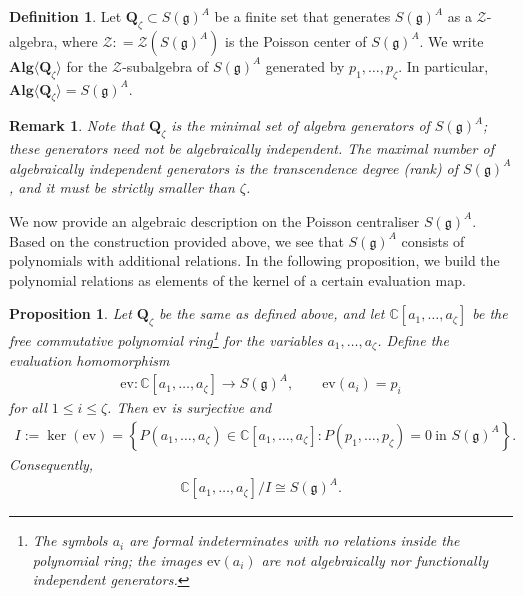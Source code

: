 \documentclass[11pt,reqno]{amsart}
\newtheorem*{theorem A}{Main Theorem A}
\newtheorem*{theorem B}{Main Theorem B}
\newtheorem*{theorem C}{Main Theorem C}
\newtheorem*{theorem D}{Main Theorem D}
\newtheorem{proposition}[theorem]{Proposition}
\theoremstyle{definition}
\newtheorem{definition}[theorem]{Definition}
\theoremstyle{plain}
\newtheorem{remark}[theorem]{Remark}
\theoremstyle{conclusion}
\begin{document}
 
\begin{definition} 
\label{def:ftal}
Let $\mathbf{Q}_\zeta \subset S(\mathfrak{g})^A$ be a finite set that generates $S(\mathfrak{g})^A$ as a $\mathcal{Z}$-algebra, where $\mathcal{Z} : = \mathcal{Z}\left(S(\mathfrak{g})^A\right)$ is the Poisson center of $S(\mathfrak{g})^A$.  We write $\mathbf{Alg}\langle \mathbf{Q}_\zeta\rangle$ for the $\mathcal{Z}$-subalgebra of $S(\mathfrak{g})^A$ generated by $p_1,\dots,p_\zeta$. In particular, $\mathbf{Alg}\langle \mathbf{Q}_\zeta\rangle = S(\mathfrak{g})^A$.
\end{definition}

\begin{remark}
    Note that $\mathbf{Q}_\zeta$ is the minimal set of algebra generators of $S(\mathfrak{g})^A$; these generators need not be algebraically independent. The maximal number of algebraically independent generators is the transcendence degree (rank) of $S(\mathfrak{g})^A$, and it must be strictly smaller than $\zeta$.
\end{remark}

We now provide an algebraic description on the Poisson centraliser $S(\mathfrak{g})^A$. Based on the construction provided above, we see that $S(\mathfrak{g})^A$ consists of polynomials with additional relations. In the following proposition, we build the polynomial relations as elements of the kernel of a certain evaluation map.


\begin{proposition} 
\label{prop:polyrelation}
Let $\mathbf{Q}_\zeta  $ be the same as defined above, and let $ \mathbb{C}[a_1 ,\dots, a_\zeta]$ be the free commutative polynomial ring\footnote{ The symbols $a_i$ are formal indeterminates with no relations inside the polynomial ring; the images $\mathrm{ev}(a_i)$ are not algebraically nor functionally independent generators.} 
for the variables $a_1,\dots,a_\zeta$. Define the evaluation homomorphism \begin{align*}
    \mathrm{ev}:\mathbb{C}[a_1,\dots,a_\zeta]\longrightarrow S(\mathfrak{g})^A,\qquad \mathrm{ev}(a_i) = p_i   
\end{align*} for all $1 \leq i\leq \zeta$. Then $\mathrm{ev}$ is surjective and \begin{align*}
    I:= \ker(\mathrm{ev}) = \left\{  P(a_1,\dots,a_\zeta)\in \mathbb{C}[a_1,\dots,a_\zeta]: P(p_1,\dots,p_\zeta) = 0\ \text{in }S(\mathfrak{g})^A \right\}.
\end{align*} Consequently, \begin{align}
    \mathbb{C}[a_1,\dots,a_\zeta]\big/ I\cong S(\mathfrak{g})^A. \label{eq:FIT}
\end{align} 
\end{proposition}
\end{document}
